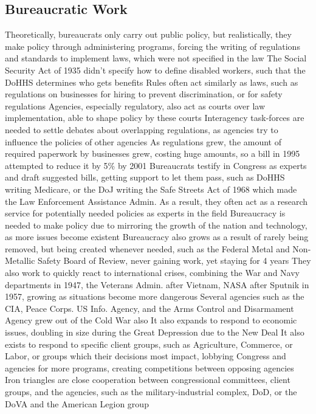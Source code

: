 \documentclass[11 pt, twoside]{article}
\newenvironment{outline*}
{
	\begin{outline}[enumerate]
	}
	{\end{outline}
}
\begin{document}
\subsection{Bureaucratic Work}
\begin{outline*}
\1 Theoretically, bureaucrats only carry out public policy, but realistically, they make policy through administering programs, forcing the writing of regulations and standards to implement laws, which were not specified in the law
\2 The Social Security Act of 1935 didn’t specify how to define disabled workers, such that the DoHHS determines who gets benefits
\2 Rules often act similarly as laws, such as regulations on businesses for hiring to prevent discrimination, or for safety regulations
\2 Agencies, especially regulatory, also act as courts over law implementation, able to shape policy by these courts
\2 Interagency task-forces are needed to settle debates about overlapping regulations, as agencies try to influence the policies of other agencies
\1 As regulations grew, the amount of required paperwork by businesses grew, costing huge amounts, so a bill in 1995 attempted to reduce it by 5\% by 2001
\1 Bureaucrats testify in Congress as experts and draft suggested bills, getting support to let them pass, such as DoHHS writing Medicare, or the DoJ writing the Safe Streets Act of 1968 which made the Law Enforcement Assistance Admin.
\2 As a result, they often act as a research service for potentially needed policies as experts in the field
\1 Bureaucracy is needed to make policy due to mirroring the growth of the nation and technology, as more issues become existent
\2 Bureaucracy also grows as a result of rarely being removed, but being created whenever needed, such as the Federal Metal and Non-Metallic Safety Board of Review, never gaining work, yet staying for 4 years
\1 They also work to quickly react to international crises, combining the War and Navy departments in 1947, the Veterans Admin. after Vietnam, NASA after Sputnik in 1957, growing as situations become more dangerous
\2 Several agencies such as the CIA, Peace Corps. US Info. Agency, and the Arms Control and Disarmament Agency grew out of the Cold War also
\2 It also expands to respond to economic issues, doubling in size during the Great Depression due to the New Deal
\1 It also exists to respond to specific client groups, such as Agriculture, Commerce, or Labor, or groups which their decisions most impact, lobbying Congress and agencies for more programs, creating competitions between opposing agencies
\2 Iron triangles are close cooperation between congressional committees, client groups, and the agencies, such as the military-industrial complex, DoD, or the DoVA and the American Legion group

\end{outline*}
\end{document}
